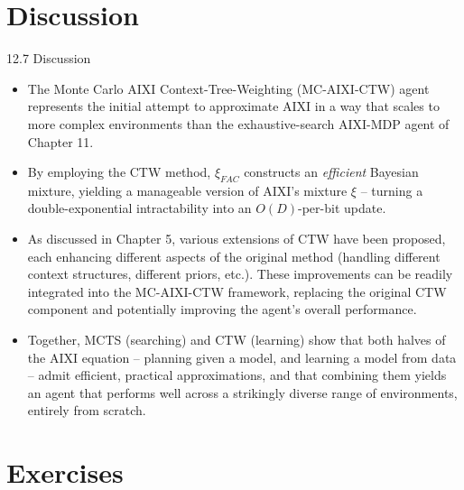 \documentclass[aspectratio=169,10pt]{beamer}
\begin{document}
\section{Discussion}

\begin{frame}{12.7 Discussion}
\begin{itemize}
\item The Monte Carlo AIXI Context-Tree-Weighting (MC-AIXI-CTW) agent represents the
initial attempt to approximate AIXI in a way that scales to more complex environments than
the exhaustive-search AIXI-MDP agent of Chapter 11.
\item By employing the CTW method, $\xi_{FAC}$ constructs an \emph{efficient} Bayesian
mixture, yielding a manageable version of AIXI's mixture $\xi$ -- turning a
double-exponential intractability into an $O(D)$-per-bit update.
\item As discussed in Chapter 5, various extensions of CTW have been proposed, each
enhancing different aspects of the original method (handling different context
structures, different priors, etc.). These improvements can be readily integrated into the
MC-AIXI-CTW framework, replacing the original CTW component and potentially improving the
agent's overall performance.
\item Together, MCTS (searching) and CTW (learning) show that both halves of the AIXI
equation -- planning given a model, and learning a model from data -- admit efficient,
practical approximations, and that combining them yields an agent that performs well
across a strikingly diverse range of environments, entirely from scratch.
\end{itemize}
\end{frame}

\section{Exercises}
\end{document}
